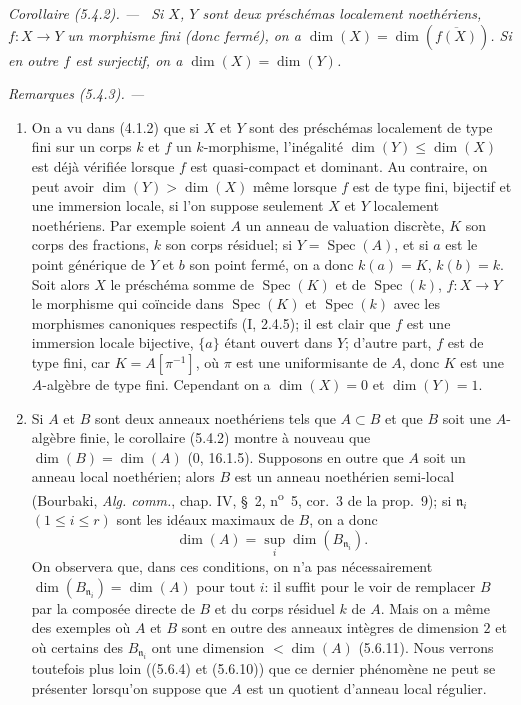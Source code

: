 \documentclass[10pt,oneside]{book}
\newenvironment{corollary}[1][]{%
  \par\medskip\noindent\itshape Corollaire (#1). ---\ }{\par}
\newenvironment{remarks}[1][]{%
  \par\medskip\noindent\itshape Remarques (#1). ---\ }{\par}
\begin{document}
\begin{corollary}[5.4.2]
\label{IV.2.s5.4.2-fr}
Si $X$, $Y$ sont deux préschémas localement noethériens, $f:X\to Y$ un
morphisme fini (donc fermé), on a
$\dim(X)=\dim(\overline{f(X)})$. Si en outre $f$ est surjectif, on a
$\dim(X)=\dim(Y)$.
\end{corollary}

\begin{remarks}[5.4.3]
\label{IV.2.s5.4.3-fr}
\begin{enumerate}
\item[(i)] On a vu dans (4.1.2) que si $X$ et $Y$ sont des préschémas
localement de type fini sur un corps $k$ et $f$ un $k$-morphisme, l'inégalité
$\dim(Y)\leq\dim(X)$ est déjà vérifiée lorsque $f$ est quasi-compact et
dominant. Au contraire, on peut avoir $\dim(Y)>\dim(X)$ même lorsque $f$ est
de type fini, bijectif et une immersion locale, si l'on suppose seulement
$X$ et $Y$ localement noethériens. Par exemple soient $A$ un anneau de
valuation discrète, $K$ son corps des fractions, $k$ son corps résiduel; si
$Y=\operatorname{Spec}(A)$, et si $a$ est le point générique de $Y$ et $b$
son point fermé, on a donc $k(a)=K$, $k(b)=k$. Soit alors $X$ le préschéma
somme de $\operatorname{Spec}(K)$ et de $\operatorname{Spec}(k)$,
$f:X\to Y$ le morphisme qui coïncide dans $\operatorname{Spec}(K)$ et
$\operatorname{Spec}(k)$ avec les morphismes canoniques respectifs
(I, 2.4.5); il est clair que $f$ est une immersion locale bijective, $\{a\}$
étant ouvert dans $Y$; d'autre part, $f$ est de type fini, car
$K=A[\pi^{-1}]$, où $\pi$ est une uniformisante de $A$, donc $K$ est une
$A$-algèbre de type fini. Cependant on a $\dim(X)=0$ et $\dim(Y)=1$.

\item[(ii)] Si $A$ et $B$ sont deux anneaux noethériens tels que $A\subset B$
et que $B$ soit une $A$-algèbre finie, le corollaire (5.4.2) montre à nouveau
que $\dim(B)=\dim(A)$ (0, 16.1.5). Supposons en outre que $A$ soit un anneau
local noethérien; alors $B$ est un anneau noethérien semi-local (Bourbaki,
\emph{Alg. comm.}, chap. IV, \S~2, n\textsuperscript{o}~5, cor.~3 de la
prop.~9); si $\mathfrak n_i$ $(1\leq i\leq r)$ sont les idéaux maximaux de
$B$, on a donc
\begin{equation}
\dim(A)=\sup_i\dim(B_{\mathfrak n_i}).
\tag{5.4.3.1}\label{IV.2.s5.4.3.1-fr}
\end{equation}
On observera que, dans ces conditions, on n'a pas nécessairement
$\dim(B_{\mathfrak n_i})=\dim(A)$ pour tout $i$: il suffit pour le voir de
remplacer $B$ par la composée directe de $B$ et du corps résiduel $k$ de
$A$. Mais on a même des exemples où $A$ et $B$ sont en outre des anneaux
intègres de dimension $2$ et où certains des $B_{\mathfrak n_i}$ ont une
dimension $<\dim(A)$ (5.6.11). Nous verrons toutefois plus loin ((5.6.4) et
(5.6.10)) que ce dernier phénomène ne peut se présenter lorsqu'on suppose
que $A$ est un quotient d'anneau local régulier.
\end{enumerate}
\end{remarks}
\end{document}
